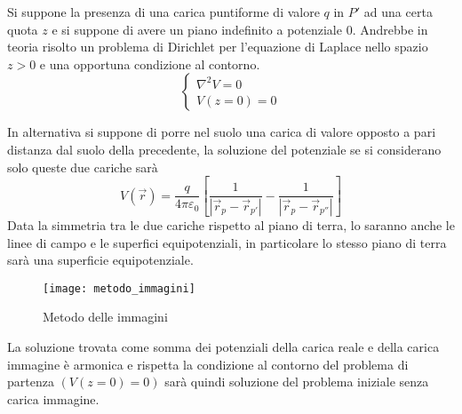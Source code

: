 Si suppone la presenza di una carica puntiforme di valore $q$ in $P'$ ad una certa quota $z$
e si suppone di avere un piano indefinito a potenziale 0.
Andrebbe in teoria risolto un problema di Dirichlet per l'equazione di Laplace nello spazio
$z>0$ e una opportuna condizione al contorno.
$$
\begin{cases}
\nabla^2 V = 0\\
V(z=0)=0
\end{cases}
$$

In alternativa si suppone di porre nel suolo una carica di valore opposto a pari distanza dal suolo
della precedente, la soluzione del potenziale se si considerano solo queste due cariche sarà
$$
V(\vec{r}) = \frac{q}{4 \pi \varepsilon_0} \left[\frac{1}{|\vec{r}_p-\vec{r}_{p'}|}-\frac{1}{|\vec{r}_p-\vec{r}_{p''}|}\right]
$$
Data la simmetria tra le due cariche rispetto al piano di
terra, lo saranno anche le linee di campo e le superfici equipotenziali, in particolare
lo stesso piano di terra sarà una superficie equipotenziale.
\begin{figure}[H]
\centering
 \texttt{[image: metodo\_immagini]}
\caption{Metodo delle immagini}
\end{figure} 
La soluzione trovata come somma dei potenziali della carica reale e della carica immagine
è armonica e rispetta la condizione al contorno del problema di partenza $(V(z=0)=0)$ sarà
quindi soluzione del problema iniziale senza carica immagine.

